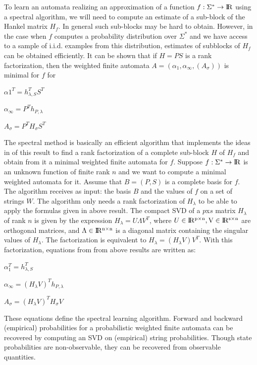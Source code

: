 \documentclass[letterpaper]{article}
\begin{document}
To learn an automata realizing an approximation of a function $f : \Sigma^{*} \rightarrow \rm I\!R$ using a spectral algorithm, we will need to compute an estimate of
a sub-block of the Hankel matrix $H_{f}$. In general such sub-blocks may be hard to
obtain. However, in the case when $f$ computes a probability distribution over $\Sigma^{*}$ and we have access to a sample of i.i.d. examples from this distribution, estimates of subblocks of $H_{f}$ can be obtained efficiently. It can be shown that if $H = PS$ is a rank factorization, then the weighted finite automata $A = (\alpha_{1}, \alpha_{\infty}, (A_{\sigma}))$ is minimal for $f$ for 
\begin{center}

$\alpha{1}^{T} = h_{\lambda, S}^{T}S^{T}$

$\alpha_{\infty}=P^{T}h_{P,\lambda}$

$A_{\sigma}=P^{T}H_{\sigma}S^{T}$ 

\end{center}
The spectral method is basically an efficient algorithm that implements the ideas in
of this result to find a rank factorization of a complete sub-block $H$ of $H_{f}$
and obtain from it a minimal weighted finite automata for $f$. Suppose $f : \Sigma^{*} \rightarrow \rm I\!R$ is an unknown function of finite rank $n$ and we want to compute a minimal weighted automata for it. Assume that $B = (P, S)$ is a complete basis for $f$. The algorithm receives as input: the basis $B$ and the values of $f$ on a set of strings $W$. The algorithm only needs a rank factorization of $H_{λ}$ to be able to apply the formulas given in above result. The compact SVD of a $p$x$s$ matrix $H_{\lambda}$ of rank $n$ is given by the expression $H_{\lambda} = U\Lambda V^{T}$, where $U \in \rm I\!R^{p\times n}, V \in \rm I\!R^{s\times n}$ are orthogonal matrices, and $\Lambda \in \rm I\!R^{n\times n}$ is a diagonal matrix containing the singular values of $H_{\lambda}$. The factorization is equivalent to $H_{\lambda} = (H_{\lambda}V)V^{T}$.
With this factorization, equations from from above results are written as:

\begin{center}

$\alpha_{1}^{T}=h^{T}_{\lambda,S}$

$\alpha_{\infty}=(H_{\lambda}V)^{T}h_{P,\lambda}$

$A_{\sigma}=(H_{\lambda}V)^{T}H_{\sigma}V$
\end{center}

These equations define the spectral learning algorithm. Forward and backward (empirical)
probabilities for a probabilistic weighted finite automata can be recovered by
computing an SVD on (empirical) string probabilities. Though state probabilities are non-observable, they can be recovered from observable quantities.
\end{document}
